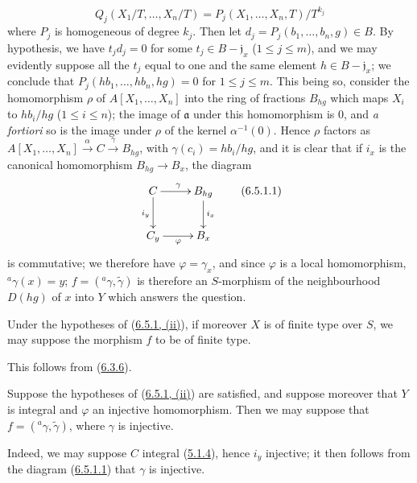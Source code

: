 \begin{enumerate}
    \[
      Q_j(X_1/T,\ldots,X_n/T)
      =P_j(X_1,\ldots,X_n,T)/T^{k_j}
    \]
    where $P_j$ is homogeneous of degree $k_j$. Then let
    $d_j=P_j(b_1,\ldots,b_n,g)\in B$. By hypothesis, we have $t_jd_j=0$ for some
    $t_j\in B-\mathfrak{j}_x$ ($1\leq j\leq m$), and we may evidently
    suppose all the $t_j$
    equal to one and the same element $h\in B-\mathfrak{j}_x$; we conclude that
    $P_j(hb_1,\ldots,hb_n,hg)=0$ for $1\leq j\leq m$. This being so, consider
    the homomorphism $\rho$ of $A[X_1,\ldots,X_n]$ into the ring of fractions
    $B_{hg}$ which maps $X_i$ to $hb_i/hg$ ($1\leq i\leq n$); the image of
    $\mathfrak{a}$ under this homomorphism is 0, and \emph{a fortiori} so is
    the image under $\rho$ of the kernel $\alpha^{-1}(0)$. Hence $\rho$
    factors as
    $A[X_1,\ldots,X_n]\xrightarrow{\alpha}C\xrightarrow{\gamma}B_{hg}$, with
    $\gamma(c_i)=hb_i/hg$, and it is clear that if $i_x$ is the canonical
    homomorphism $B_{hg}\to B_x$, the diagram
    \[
      \xymatrix{
        C\ar[r]^\gamma\ar[d]_{i_y} & B_{hg}\ar[d]^{i_x}\\
        C_y\ar[r]_\varphi & B_x
      }
      \tag{6.5.1.1}\label{I.6.5.1.1}
    \]
    is commutative; we therefore have $\varphi=\gamma_x$, and since $\varphi$ is
    a local homomorphism, ${}^a\gamma(x)=y$; $f=({}^a\gamma,\widetilde{\gamma})$
    is therefore an $S$-morphism of the neighbourhood $D(hg)$ of $x$ into $Y$
    which answers the question.
\end{enumerate}

\begin{corollary}[6.5.2]
\label{I.6.5.2}
Under the hypotheses of (\hyperref[I.6.5.1]{6.5.1, (ii)}), if moreover $X$
is of finite type over $S$, we may suppose the morphism $f$ to be of finite
type.
\end{corollary}

This follows from (\hyperref[I.6.3.6]{6.3.6}).

\begin{corollary}[6.5.3]
\label{I.6.5.3}
Suppose the hypotheses of
(\hyperref[I.6.5.1]{6.5.1, (ii)}) are satisfied, and suppose moreover that
$Y$ is integral and $\varphi$ an injective homomorphism. Then we may suppose
that $f=({}^a\gamma,\widetilde{\gamma})$, where $\gamma$ is injective.
\end{corollary}

Indeed, we may suppose $C$ integral
(\hyperref[I.5.1.4]{5.1.4}), hence $i_y$ injective; it then follows from the
diagram (\hyperref[I.6.5.1.1]{6.5.1.1}) that $\gamma$ is injective.

